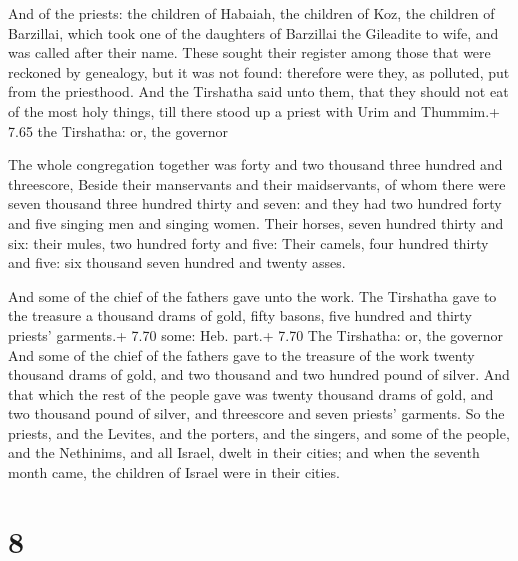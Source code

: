  And of the priests: the children of Habaiah, the
children of Koz, the children of Barzillai, which took one of the
daughters of Barzillai the Gileadite to wife, and was called after their
name.  These sought their register among those that were
reckoned by genealogy, but it was not found: therefore were they, as
polluted, put from the priesthood.  And the Tirshatha said
unto them, that they should not eat of the most holy things, till there
stood up a priest with Urim and Thummim.+ 7.65 the Tirshatha: or, the
governor

 The whole congregation together was forty and two
thousand three hundred and threescore,  Beside their
manservants and their maidservants, of whom there were seven thousand
three hundred thirty and seven: and they had two hundred forty and five
singing men and singing women.  Their horses, seven hundred
thirty and six: their mules, two hundred forty and five: 
Their camels, four hundred thirty and five: six thousand seven hundred
and twenty asses.

 And some of the chief of the fathers gave unto the work.
The Tirshatha gave to the treasure a thousand drams of gold, fifty
basons, five hundred and thirty priests' garments.+ 7.70 some: Heb.
part.+ 7.70 The Tirshatha: or, the governor  And some of
the chief of the fathers gave to the treasure of the work twenty
thousand drams of gold, and two thousand and two hundred pound of
silver.  And that which the rest of the people gave was
twenty thousand drams of gold, and two thousand pound of silver, and
threescore and seven priests' garments.  So the priests,
and the Levites, and the porters, and the singers, and some of the
people, and the Nethinims, and all Israel, dwelt in their cities; and
when the seventh month came, the children of Israel were in their
cities.

\hypertarget{section-7}{%
\section{8}\label{section-7}}

